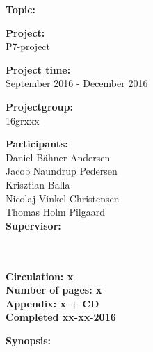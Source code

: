 \begin{minipage}[t]{0.48\textwidth}
\textbf{Topic:} \\[5pt]\bigskip\hspace{2ex}

\textbf{Project:} \\[5pt]\bigskip\hspace{2ex}
P7-project

\textbf{Project time:} \\[5pt]\bigskip\hspace{2ex}
September 2016 - December 2016

\textbf{Projectgroup:} \\[5pt]\bigskip\hspace{2ex}
16grxxx	

\textbf{Participants:} \\[5pt]\hspace*{2ex}
Daniel Bähner Andersen \\\hspace*{2ex}
Jacob Naundrup Pedersen\\\hspace*{2ex}
Krisztian Balla \\\hspace*{2ex}
Nicolaj Vinkel Christensen \\\hspace*{2ex}
Thomas Holm Pilgaard \\

\textbf{Supervisor:} \\[5pt]\hspace*{2ex}
 \\\hspace*{2ex}
 \\\bigskip\hspace{2ex}

\vspace*{3.5cm}

\textbf{Circulation: x} \\
\textbf{Number of pages: x}\\
\textbf{Appendix: x + CD} \\
\textbf{Completed xx-xx-2016}\\
\end{minipage}
\hfill
\begin{minipage}[t]{0.483\textwidth}
\textbf{Synopsis:} \\[5pt]
\fbox{\parbox{7cm}{\bigskip\bigskip}}
\end{minipage}

\vfill

